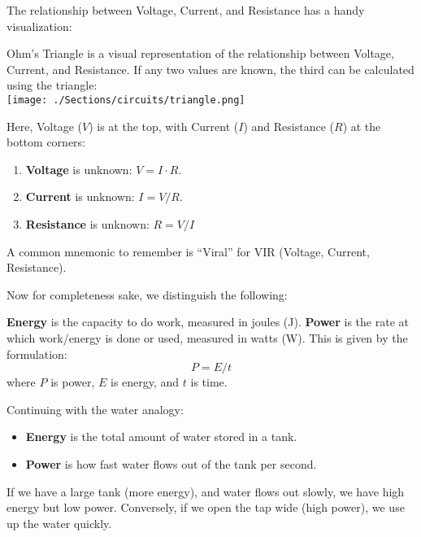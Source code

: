 \noindent
The relationship between Voltage, Current, and Resistance has a handy visualization:

\begin{Def}

    \label{def:ohms_triangle}

    \noindent
    Ohm's Triangle is a visual representation of the relationship between Voltage, Current, and Resistance. 
    If any two values are known, the third can be calculated using the triangle:\\

\noindent
    \texttt{[image: ./Sections/circuits/triangle.png]}

    \noindent
    Here, Voltage ($V$) is at the top, with Current ($I$) and Resistance ($R$) at the bottom corners:
    \begin{enumerate}
        \item \textbf{Voltage} is unknown: $V = I \cdot R$.
        \item \textbf{Current} is unknown: $I = V / R$.
        \item \textbf{Resistance} is unknown: $R = V / I$
    \end{enumerate}

    \noindent
    A common mnemonic to remember is ``Viral'' for VIR (Voltage, Current, Resistance).
\end{Def}

\newpage 

\noindent
Now for completeness sake, we distinguish the following:

\begin{Def}

    \label{def:energy_power}

    \noindent
    \textbf{Energy} is the capacity to do work, measured in joules (J). 
    \textbf{Power} is the rate at which work/energy is done or used, measured in watts (W).
    \noindent
    This is given by the formulation:
    \[
        P = E / t
    \]
    where $P$ is power, $E$ is energy, and $t$ is time.
\end{Def}

\noindent
\begin{Example}

    \noindent
    Continuing with the water analogy:
    \begin{itemize}
        \item \textbf{Energy} is the total amount of water stored in a tank.
        \item \textbf{Power} is how fast water flows out of the tank per second.
    \end{itemize}
    \noindent
    If we have a large tank (more energy), and water flows out slowly, we have high energy but low power. 
    Conversely, if we open the tap wide (high power), we use up the water quickly.

   
\end{Example}

